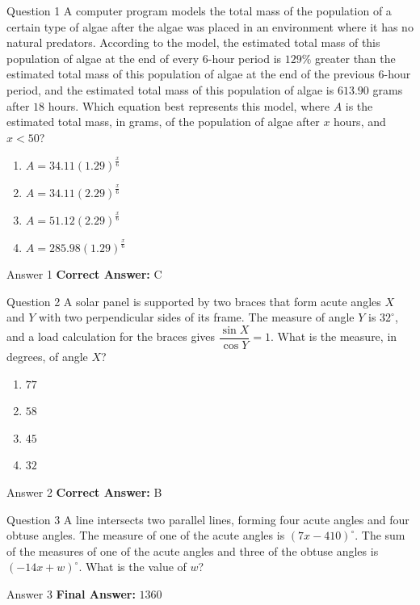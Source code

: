 \documentclass{beamer}
\begin{document}
\begin{frame}{Question 1}
\small
A computer program models the total mass of the population of a certain type of algae after the algae was placed in an environment where it has no natural predators. According to the model, the estimated total mass of this population of algae at the end of every 6-hour period is \(129\%\) greater than the estimated total mass of this population of algae at the end of the previous 6-hour period, and the estimated total mass of this population of algae is \(613.90\) grams after \(18\) hours.
Which equation best represents this model, where \(A\) is the estimated total mass, in grams, of the population of algae after \(x\) hours, and \(x < 50\)?
\vspace{0.35cm}
\begin{enumerate}
    \item[A.] \(A = 34.11(1.29)^{\frac{x}{6}}\)
    \item[B.] \(A = 34.11(2.29)^{\frac{x}{6}}\)
    \item[C.] \(A = 51.12(2.29)^{\frac{x}{6}}\)
    \item[D.] \(A = 285.98(1.29)^{\frac{x}{6}}\)
\end{enumerate}
\end{frame}
\begin{frame}{Answer 1}
\small
\textbf{Correct Answer:} C
\end{frame}

\begin{frame}{Question 2}
\small
A solar panel is supported by two braces that form acute angles \(X\) and \(Y\) with two perpendicular sides of its frame. The measure of angle \(Y\) is \(32^\circ\), and a load calculation for the braces gives \(\dfrac{\sin X}{\cos Y}=1\).
What is the measure, in degrees, of angle \(X\)?
\vspace{0.35cm}
\begin{enumerate}
    \item[A.] \(77\)
    \item[B.] \(58\)
    \item[C.] \(45\)
    \item[D.] \(32\)
\end{enumerate}
\end{frame}
\begin{frame}{Answer 2}
\small
\textbf{Correct Answer:} B
\end{frame}

\begin{frame}{Question 3}
\small
A line intersects two parallel lines, forming four acute angles and four obtuse angles. The measure of one of the acute angles is \((7x - 410)^\circ\). The sum of the measures of one of the acute angles and three of the obtuse angles is \((-14x + w)^\circ\).
What is the value of \(w\)?
\end{frame}
\begin{frame}{Answer 3}
\small
\textbf{Final Answer:} $\boxed{1360}$
\end{frame}
\end{document}
